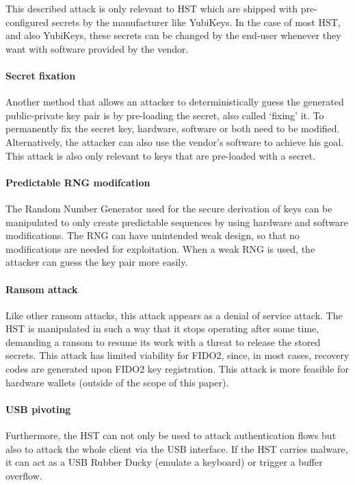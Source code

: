 \documentclass[runningheads]{llncs}
\begin{document}
This described attack is only relevant to HST which are shipped with pre-configured secrets by the manufacturer like YubiKeys. In the case of most HST, and also YubiKeys, these secrets can be changed by the end-user whenever they want with software provided by the vendor.

\paragraph{Secret fixation}
Another method that allows an attacker to deterministically guess the generated public-private key pair is by pre-loading the secret, also called ‘fixing’ it. To permanently fix the secret key, hardware, software or both need to be modified. Alternatively, the attacker can also use the vendor's software to achieve his goal. This attack is also only relevant to keys that are pre-loaded with a secret.

\paragraph{Predictable RNG modifcation}
The Random Number Generator used for the secure derivation of keys can be manipulated to only create predictable sequences by using hardware and software modifications. The RNG can have unintended weak design, so that no modifications are needed for exploitation. When a weak RNG is used, the attacker can guess the key pair more easily.

\paragraph{Ransom attack}
Like other ransom attacks, this attack appears as a denial of service attack. The HST is manipulated in such a way that it stops operating after some time, demanding a ransom to resume its work with a threat to release the stored secrets. This attack has limited viability for FIDO2, since, in most cases, recovery codes are generated upon FIDO2 key registration. This attack is more feasible for hardware wallets (outside of the scope of this paper).

\paragraph{USB pivoting}
Furthermore, the HST can not only be used to attack authentication flows but also to attack the whole client via the USB interface. If the HST carries malware, it can act as a USB Rubber Ducky (emulate a keyboard) or trigger a buffer overflow.
\end{document}
